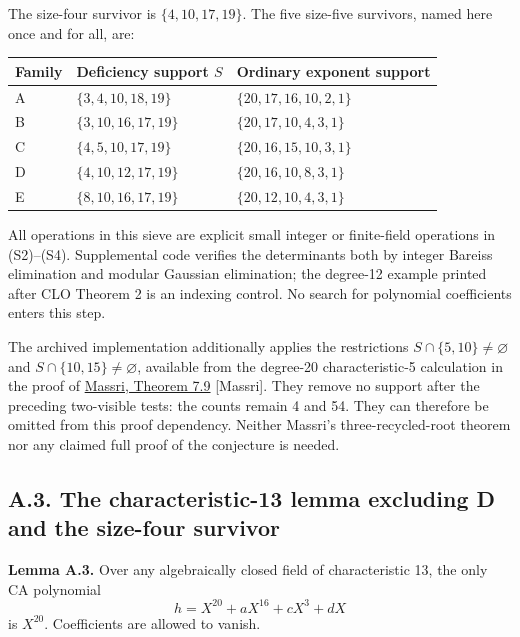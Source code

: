 \documentclass[
  british,
  10pt,
  a4paper,
]{article}
\newcounter{none} %
\begin{document}
The size-four survivor is \(\{4,10,17,19\}\). The five size-five
survivors, named here once and for all, are:

{\def\LTcaptype{none} %
\begin{longtable}[]{@{}lll@{}}
\toprule\noalign{}
Family & Deficiency support \(S\) & Ordinary exponent support \\
\midrule\noalign{}
\endhead
\bottomrule\noalign{}
\endlastfoot
A & \(\{3,4,10,18,19\}\) & \(\{20,17,16,10,2,1\}\) \\
B & \(\{3,10,16,17,19\}\) & \(\{20,17,10,4,3,1\}\) \\
C & \(\{4,5,10,17,19\}\) & \(\{20,16,15,10,3,1\}\) \\
D & \(\{4,10,12,17,19\}\) & \(\{20,16,10,8,3,1\}\) \\
E & \(\{8,10,16,17,19\}\) & \(\{20,12,10,4,3,1\}\) \\
\end{longtable}
}

All operations in this sieve are explicit small integer or finite-field
operations in (S2)--(S4). Supplemental code verifies the determinants
both by integer Bareiss elimination and modular Gaussian elimination;
the degree-12 example printed after CLO Theorem 2 is an indexing
control. No search for polynomial coefficients enters this step.

The archived implementation additionally applies the restrictions
\(S\cap\{5,10\}\ne\varnothing\) and \(S\cap\{10,15\}\ne\varnothing\),
available from the degree-20 characteristic-5 calculation in the proof
of \href{https://arxiv.org/html/1806.09561v6}{Massri, Theorem 7.9}
{[}Massri{]}. They remove no support after the preceding two-visible
tests: the counts remain 4 and 54. They can therefore be omitted from
this proof dependency. Neither Massri's three-recycled-root theorem nor
any claimed full proof of the conjecture is needed.

\subsection*{A.3. The characteristic-13 lemma excluding D and the
size-four
survivor}\label{a.3.-the-characteristic-13-lemma-excluding-d-and-the-size-four-survivor}

\textbf{Lemma A.3.} Over any algebraically closed field of
characteristic 13, the only CA polynomial \[
h=X^{20}+aX^{16}+cX^3+dX
\] is \(X^{20}\). Coefficients are allowed to vanish.
\end{document}
